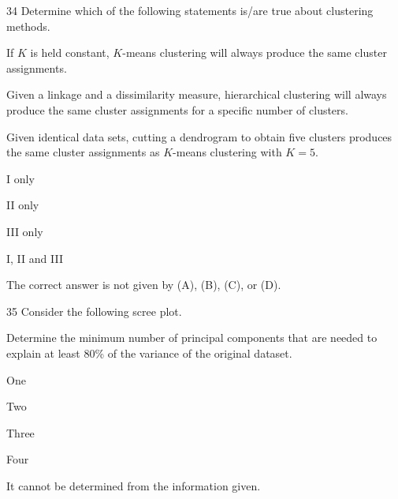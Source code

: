\begin{question}{34}
Determine which of the following statements is/are true about clustering methods.
\begin{statements}
\item If $K$ is held constant, $K$-means clustering will always produce the same cluster assignments.
\item Given a linkage and a dissimilarity measure, hierarchical clustering will always produce the same cluster assignments for a specific number of clusters.
\item Given identical data sets, cutting a dendrogram to obtain five clusters produces the same cluster assignments as $K$-means clustering with $K = 5$.
\end{statements}

\begin{choices}
\item I only
\item II only
\item III only
\item I, II and III
\item The correct answer is not given by (A), (B), (C), or (D).
\end{choices}
\end{question}

\begin{question}{35}
Consider the following scree plot.


Determine the minimum number of principal components that are needed to explain at least 80\% of the variance of the original dataset.

\begin{choices}
\item One
\item Two
\item Three
\item Four
\item It cannot be determined from the information given.
\end{choices}
\end{question}

